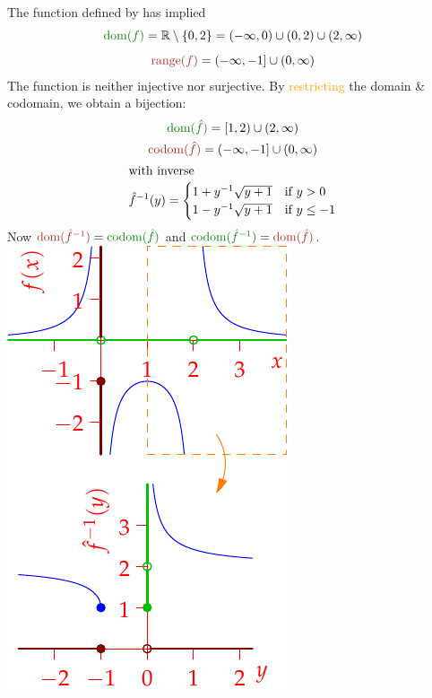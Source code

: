 \begin{example}[lower separated=false, sidebyside, sidebyside align=top seam, sidebyside gap=0pt, righthand width=0.32\linewidth]{}{}
	The function defined by 
	has implied
	\begin{gather*}
		\textcolor{Green}{\dom(f)}=\R\setminus\{0,2\}=(-\infty,0)\cup(0,2)\cup (2,\infty)\\[5pt]
		\textcolor{Brown}{\range(f)}=(-\infty,-1]\cup(0,\infty)
	\end{gather*}
	The function is neither injective nor surjective.	By \textcolor{orange}{restricting} the domain \& codomain, we obtain a bijection:
	\begin{gather*}
		\textcolor{Green}{\dom(\hat f)}=[1,2)\cup(2,\infty)\\
		\textcolor{Brown}{\operatorname{codom}(\hat f)}=(-\infty,-1]\cup(0,\infty)\\
		\intertext{with inverse}
		\hat f^{-1}(y)=
		\begin{cases}
			1+y^{-1}\sqrt{y+1}&\text{if }y>0\\
			1-y^{-1}\sqrt{y+1}&\text{if }y\le -1
		\end{cases}
	\end{gather*}
	Now $\textcolor{Brown}{\dom(\hat f^{-1})}=\textcolor{Green}{\operatorname{codom}(\hat f)}$ and $\textcolor{Green}{\operatorname{codom}(\hat f^{-1})}=\textcolor{Brown}{\dom(\hat f)}$.
	\tcblower
	\flushright\includegraphics{dom4}
\end{example}

